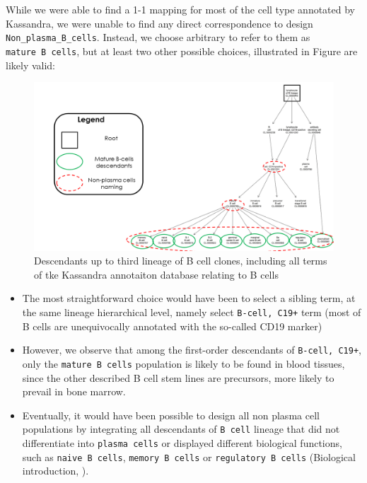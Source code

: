 While we were able to find a 1-1 mapping for most of the cell type annotated by Kassandra, we were unable to find any direct correspondence to design \texttt{Non\_plasma\_B\_cells}. Instead, we choose arbitrary to refer to them as \texttt{mature\ B\ cells}, but at least two other possible choices, illustrated in Figure  are likely valid:

\begin{figure}

{\centering \includegraphics[width=0.9\linewidth]{./figures/B_cell_ontology_caption} 

}

\caption{Descendants up to third lineage of B cell clones, including all terms of tke Kassandra annotaiton database relating to B cells}\label{fig:B-cell-ontology}
\end{figure}

\begin{itemize}
\item
  The most straightforward choice would have been to select a sibling term, at the same lineage hierarchical level, namely select \texttt{B-cell,\ C19+} term (most of B cells are unequivocally annotated with the so-called CD19 marker)
\item
  However, we observe that among the first-order descendants of \texttt{B-cell,\ C19+}, only the \texttt{mature\ B\ cells} population is likely to be found in blood tissues, since the other described B cell stem lines are precursors, more likely to prevail in bone marrow.
\item
  Eventually, it would have been possible to design all non plasma cell populations by integrating all descendants of \texttt{B\ cell} lineage that did not differentiate into \texttt{plasma\ cells} or displayed different biological functions, such as \texttt{naive\ B\ cells}, \texttt{memory\ B\ cells} or \texttt{regulatory\ B\ cells} (Biological introduction, ).
\end{itemize}

